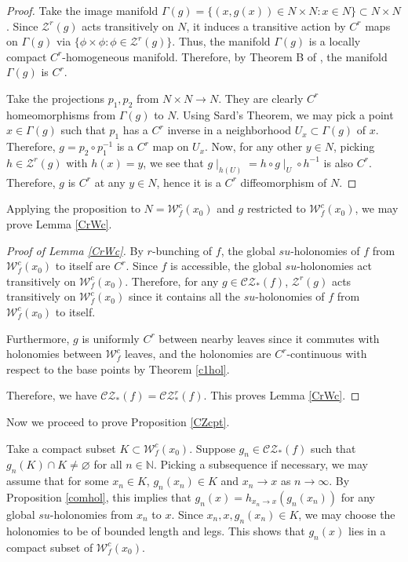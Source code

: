 \documentclass[11pt]{amsart}
\numberwithin{equation}{section}
\newcommand{\N}{\mathbb{N}}
\newcommand{\W}{\mathcal{W}}
\newcommand{\CZ}{\mathcal{CZ}}
\theoremstyle{plain}
\begin{document}
\begin{proof}
Take the image manifold $\Gamma(g)=\{(x,g(x))\in N\times N:x\in N\}\subset N\times N$. Since $\mathcal{Z}^r(g)$ acts transitively on $N$, it induces a transitive action by $C^r$ maps on $\Gamma(g)$ via $\{\phi\times \phi:\phi\in \mathcal{Z}^r(g)\}$. Thus, the manifold $\Gamma(g)$ is a locally compact $C^r$-homogeneous manifold. Therefore, by Theorem B of \cite{wilkcoh}, the manifold $\Gamma(g)$ is $C^r$.

Take the projections $p_1,p_2$ from $N\times N\to N$. They are clearly $C^r$ homeomorphisms from $\Gamma(g)$ to $N$. Using Sard's Theorem, we may pick a point $x\in\Gamma(g)$ such that $p_1$ has a $C^r$ inverse in a neighborhood $U_x\subset \Gamma(g)$ of $x$. Therefore, $g=p_2\circ p_1^{-1}$ is a $C^r$ map on $U_x$. Now, for any other $y\in N$, picking $h\in \mathcal{Z}^r(g)$ with $h(x)=y$, we see that $g\mid_{h(U)}=h\circ g\mid_U \circ h^{-1}$ is also $C^r$. Therefore, $g$ is $C^r$ at any $y\in N$, hence it is a $C^r$ diffeomorphism of $N$.
\end{proof}

Applying the proposition to $N=\W^c_f(x_0)$ and $g$ restricted to $\W^c_f(x_0)$, we may prove Lemma \ref{CrWc}.

\begin{proof}[Proof of Lemma \ref{CrWc}]
By $r$-bunching of $f$, the global $su$-holonomies of $f$ from $\W^c_f(x_0)$ to itself {are} $C^r$. Since $f$ is accessible, the global $su$-holonomies act transitively on $\W^c_f(x_0)$. Therefore, for any $g\in \CZ_*(f)$, $\mathcal{Z}^r(g)$ acts transitively on $\W^c_f(x_0)$ since it contains all the $su$-holonomies of $f$ from $\W^c_f(x_0)$ to itself.

Furthermore, $g$ is uniformly $C^r$ between nearby leaves since it commutes with holonomies between $\W^c_f$ leaves, and the holonomies are $C^r$-continuous with respect to the base points by Theorem \ref{c1hol}.

Therefore, we have $\CZ_*(f)=\CZ_*^r(f)$. This proves Lemma \ref{CrWc}.
\end{proof}

Now we proceed to prove Proposition \ref{CZcpt}.

Take a compact subset $K\subset \W^c_f(x_0)$. Suppose $g_n\in \CZ_*(f)$ such that $g_n(K)\cap K\neq \varnothing$ for all $n\in \N$. Picking a subsequence if necessary, we may assume that for some $x_n\in K$, $g_n(x_n)\in K$ and $x_n\to x$ as $n\to \infty$. By Proposition \ref{comhol}, this implies that $g_n(x)=h_{x_n\to x}(g_n(x_n))$ for any global $su$-holonomies from $x_n$ to $x$. Since $x_n,x,g_n(x_n)\in K$, we may choose the holonomies to be of bounded length and legs. This shows that $g_n(x)$ lies in a compact subset of $\W^c_f(x_0)$.
\end{document}
